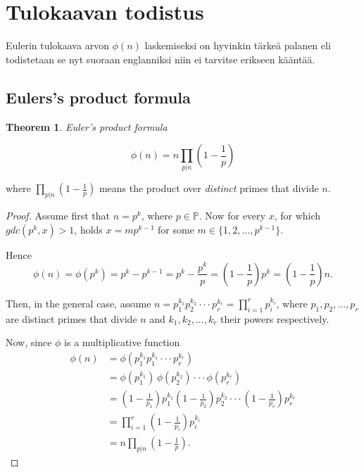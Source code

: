 \documentclass{article}
\theoremstyle{definition}
\newtheorem{theorem}[subsection]{Theorem}
\begin{document}
\section{Tulokaavan todistus}

Eulerin tulokaava arvon $\phi(n)$ laskemiseksi on hyvinkin tärkeä palanen eli todistetaan se nyt suoraan englanniksi niin ei tarvitse erikseen kääntää.

\subsection{Eulers's product formula}

\begin{theorem}{\emph{Euler's product formula}}

\begin{equation*}
    \phi(n) = n \prod_{p \vert n} \left(1 - \frac{1}{p}\right)
\end{equation*}

where $\prod_{p \vert n} (1 - \frac{1}{p})$ means the product over \emph{distinct} primes that divide $n$.

\begin{proof}

Assume first that $n = p^k$, where $p\in \mathbb{P}$. Now for every $x$, for which $gdc(p^k,x)>1$, holds $x=mp^{k-1}$ for some $m\in \{1,2,...,p^{k-1}\}$.


Hence
\begin{equation*}
    \phi(n)=\phi(p^k)=p^k-p^{k-1}=p^k-\frac{p^k}{p}=\left(1-\frac{1}{p}\right)p^k=\left(1-\frac{1}{p}\right)n.
\end{equation*}

Then, in the general case, assume $n=p_1^{k_1} p_2^{k_2} \cdot \cdot \cdot p_r^{k_r}=\prod_{i=1}^r p_i^{k_i}$, where $p_1,p_2,...,p_r$ are distinct primes that divide $n$ and $k_1,k_2,...,k_r$ their powers respectively. 


Now, since $\phi$ is a multiplicative function
\begin{align*}
    \phi(n) & = \phi(p_1^{k_1} p_1^{k_1} \cdot \cdot \cdot p_r^{k_r})\\
    & = \phi(p_1^{k_1})\,\phi(p_2^{k_2}) \cdot \cdot \cdot \phi(p_r^{k_r})\\
    & = \left(1-\frac{1}{p_1}\right)p_1^{k_1} \left(1-\frac{1}{p_2}\right)p_2^{k_2} \cdot \cdot \cdot \left(1-\frac{1}{p_r}\right)p_r^{k_r}\\
    & = \prod_{i=1}^r \left(1-\frac{1}{p_i}\right) p_i^{k_i}\\
    & = n \prod_{p \vert n} \left(1 - \frac{1}{p}\right).
\end{align*}

\end{proof}

\end{theorem}
\end{document}
